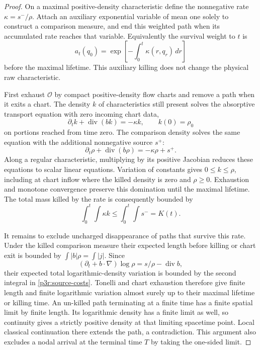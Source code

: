 \documentclass[11pt]{article}
\numberwithin{equation}{section}
\theoremstyle{definition}
\theoremstyle{remark}
\begin{document}
\begin{proof}
On a maximal positive-density characteristic define the nonnegative rate $\kappa=s^-/\rho$. Attach an auxiliary exponential variable of mean one solely to construct a comparison measure, and end this weighted path when its accumulated rate reaches that variable. Equivalently the survival weight to $t$ is
\[
 a_t(q_0)=\exp\left[-\int_0^t\kappa(r,q_r)\,dr\right]
\]
before the maximal lifetime. This auxiliary killing does not change the physical raw characteristic.

First exhaust $\mathcal O$ by compact positive-density flow charts and remove a path when it exits a chart. The density $k$ of characteristics still present solves the absorptive transport equation with zero incoming chart data,
\[
 \partial_tk+\operatorname{div}(bk)=-\kappa k,
 \qquad k(0)=\rho_0
\]
on portions reached from time zero. The comparison density solves the same equation with the additional nonnegative source $s^+$:
\[
 \partial_t\rho+\operatorname{div}(b\rho)=-\kappa\rho+s^+.
\]
Along a regular characteristic, multiplying by its positive Jacobian reduces these equations to scalar linear equations. Variation of constants gives $0\le k\le\rho$, including at chart inflow where the killed density is zero and $\rho\ge0$. Exhaustion and monotone convergence preserve this domination until the maximal lifetime. The total mass killed by the rate is consequently bounded by
\begin{equation}\label{p3r:hazard-cost}
 \int_0^t\!\int\kappa k\le\int_0^t\!\int s^-=K(t).
\end{equation}

It remains to exclude uncharged disappearance of paths that survive this rate. Under the killed comparison measure their expected length before killing or chart exit is bounded by $\int|b|\rho=\int|j|$. Since
\[
 (\partial_t+b\cdot\nabla)\log\rho
       =s/\rho-\operatorname{div}b,
\]
their expected total logarithmic-density variation is bounded by the second integral in \eqref{p3r:source-costs}. Tonelli and chart exhaustion therefore give finite length and finite logarithmic variation almost surely up to their maximal lifetime or killing time. An un-killed path terminating at a finite time has a finite spatial limit by finite length. Its logarithmic density has a finite limit as well, so continuity gives a strictly positive density at that limiting spacetime point. Local classical continuation there extends the path, a contradiction. This argument also excludes a nodal arrival at the terminal time $T$ by taking the one-sided limit.


\end{proof}
\end{document}
